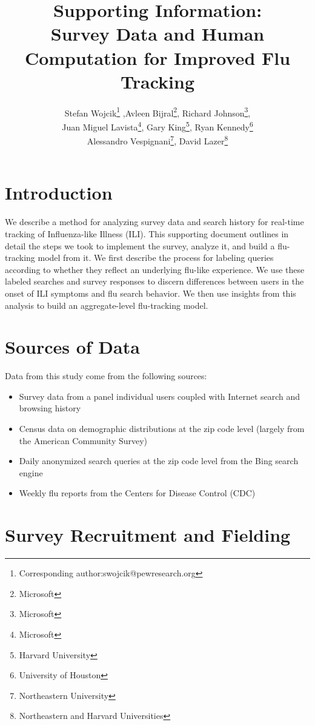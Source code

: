 \documentclass[12pt]{article}
\title{Supporting Information: \\ Survey Data and Human Computation for Improved Flu Tracking}
\author{Stefan Wojcik\footnote{Corresponding author:swojcik@pewresearch.org}
,Avleen Bijral\footnote{Microsoft}, 
Richard Johnson\footnote{Microsoft},\\
Juan Miguel Lavista\footnote{Microsoft}, 
Gary King\footnote{Harvard University}, 
Ryan Kennedy\footnote{University of Houston}\\ 
Alessandro Vespignani\footnote{Northeastern University},
David Lazer\footnote{Northeastern and Harvard Universities}}
\begin{document}
\maketitle

\clearpage

\tableofcontents

\clearpage

\singlespacing

\newpage

\section{Introduction}

We describe a method for analyzing survey data and search history for real-time tracking of Influenza-like Illness (ILI). This supporting document outlines in detail the steps we took to implement the survey, analyze it, and build a flu-tracking model from it. We first describe the process for labeling queries according to whether they reflect an underlying flu-like experience. We use these labeled searches and survey responses to discern differences between users in the onset of ILI symptoms and flu search behavior. We then use insights from this analysis to build an aggregate-level flu-tracking model. 

\section{Sources of Data}
Data from this study come from the following sources:
\begin{itemize}
\item Survey data from a panel individual users coupled with Internet search and browsing history
\item Census data on demographic distributions at the zip code level (largely from the American Community Survey)
\item Daily anonymized search queries at the zip code level from the Bing search engine
\item Weekly flu reports from the Centers for Disease Control (CDC)
\end{itemize}

\section{Survey Recruitment and Fielding}
\end{document}
